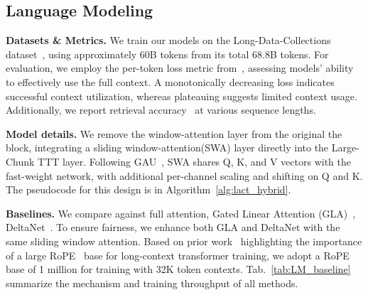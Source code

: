 \documentclass{article}
\begin{document}
 
\subsection{Language Modeling}\label{sec:exp_language}

\noindent\textbf{Datasets \& Metrics.}
We train our models on the Long-Data-Collections dataset~\cite{long_data_collection}, using approximately 60B tokens from its total 68.8B tokens. For evaluation, we employ the per-token loss metric from~\cite{linforgetting}, assessing models' ability to effectively use the full context. A monotonically decreasing loss indicates successful context utilization, whereas plateauing suggests limited context usage. Additionally, we report retrieval accuracy~\cite{hsiehruler} at various sequence lengths.

\noindent\textbf{Model details.} We remove the window-attention layer from the original the \methodname{} block, integrating a sliding window-attention(SWA) layer directly into the Large-Chunk TTT layer. Following GAU~\cite{hua2022transformer}, SWA shares Q, K, and V vectors with the fast-weight network, with additional per-channel scaling and shifting on Q and K. 
The pseudocode for this design is in Algorithm~\ref{alg:lact_hybrid}.

\noindent\textbf{Baselines.}
We compare against full attention, Gated Linear Attention (GLA)~\cite{yang2024gated}, DeltaNet~\cite{schlag2021linear,yangparallelizing}. To ensure fairness, we enhance both GLA and DeltaNet with the same sliding window attention. Based on prior work~\cite{linforgetting, xiong2023effective, men2024base} highlighting the importance of a large RoPE~\cite{su2023roformer} base for long-context transformer training,  we adopt a RoPE base of 1 million for training with 32K token contexts.
Tab.~\ref{tab:LM_baseline} summarize the mechanism and training throughput of all methods. 
\end{document}
